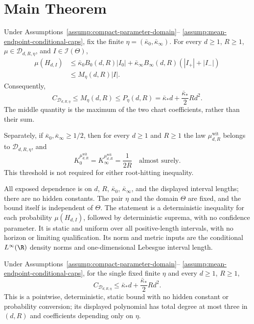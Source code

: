\section{Main Theorem}

\begin{theorem}
\label{thm:main}
Under Assumptions~\ref{assump:compact-parameter-domain}--
\ref{assump:mean-endpoint-conditional-caps}, fix the finite
$\eta=(\bar\kappa_0,\bar\kappa_\infty)$.  For every $d\geq1$, $R\geq1$,
$\mu\in\mathcal D_{d,R,\eta}$, and $I\in\mathcal I(\Theta)$,
\[
\begin{aligned}
\mu(H_{d,I})
&\leq \bar\kappa_0B_0(d,R)|I_0|
 +\bar\kappa_\infty B_\infty(d,R)(|I_+|+|I_-|)\\
&\leq M_\eta(d,R)|I|.
\end{aligned}
\]
Consequently,
\[
\boxed{
C_{\mathcal D_{d,R,\eta}}
\leq M_\eta(d,R)
\leq P_\eta(d,R)
=\bar\kappa_*d+\frac{\bar\kappa_*}{2}Rd^2.}
\]
The middle quantity is the maximum of the two chart coefficients, rather
than their sum.

Separately, if $\bar\kappa_0,\bar\kappa_\infty\geq1/2$, then for every
$d\geq1$ and $R\geq1$ the law $\mu^{\mathrm{wit}}_{d,R}$ belongs to
$\mathcal D_{d,R,\eta}$, and
\[
K_0^{\mu^{\mathrm{wit}}_{d,R}}
=K_\infty^{\mu^{\mathrm{wit}}_{d,R}}
=\frac1{2R}
\quad\text{almost surely}.
\]
This threshold is not required for either root-hitting inequality.

All exposed dependence is on $d$, $R$, $\bar\kappa_0$,
$\bar\kappa_\infty$, and the displayed interval lengths; there are no
hidden constants.  The pair $\eta$ and the domain $\Theta$ are fixed, and
the bound itself is independent of $\Theta$.  The statement is a
deterministic inequality for each probability $\mu(H_{d,I})$, followed by
deterministic suprema, with no confidence parameter.  It is static and
uniform over all positive-length intervals, with no horizon or limiting
qualification.  Its norm and metric inputs are the conditional
$L^\infty(\R)$ density norms and one-dimensional Lebesgue interval length.
\end{theorem}

\begin{corollary}
\label{cor:fixed-cap-rate}
Under Assumptions~\ref{assump:compact-parameter-domain}--
\ref{assump:mean-endpoint-conditional-caps}, for the single fixed finite
$\eta$ and every $d\geq1$, $R\geq1$,
\[
C_{\mathcal D_{d,R,\eta}}
\leq \bar\kappa_*d+\frac{\bar\kappa_*}{2}Rd^2.
\]
This is a pointwise, deterministic, static bound with no hidden constant or
probability conversion; its displayed polynomial has total degree at most
three in $(d,R)$ and coefficients depending only on $\eta$.
\end{corollary}

